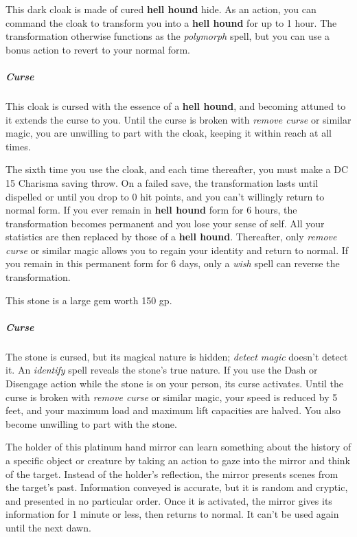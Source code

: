\documentclass[10pt,a4paper,twoside,bg=print,twocolumn,openany,nodeprecatedcode]{dndbook}
\begin{document}
This dark cloak is made of cured \textbf{hell hound} hide. As an action, you can command the cloak to transform you into a \textbf{hell hound} for up to 1 hour. The transformation otherwise functions as the \textit{polymorph} spell, but you can use a bonus action to revert to your normal form.

\subparagraph{Curse}
This cloak is cursed with the essence of a \textbf{hell hound}, and becoming attuned to it extends the curse to you. Until the curse is broken with \textit{remove curse} or similar magic, you are unwilling to part with the cloak, keeping it within reach at all times.

The sixth time you use the cloak, and each time thereafter, you must make a DC 15 Charisma saving throw. On a failed save, the transformation lasts until dispelled or until you drop to 0 hit points, and you can't willingly return to normal form. If you ever remain in \textbf{hell hound} form for 6 hours, the transformation becomes permanent and you lose your sense of self. All your statistics are then replaced by those of a \textbf{hell hound}. Thereafter, only \textit{remove curse} or similar magic allows you to regain your identity and return to normal. If you remain in this permanent form for 6 days, only a \textit{wish} spell can reverse the transformation.

This stone is a large gem worth 150 gp.

\subparagraph{Curse}
The stone is cursed, but its magical nature is hidden; \textit{detect magic} doesn't detect it. An \textit{identify} spell reveals the stone's true nature. If you use the Dash or Disengage action while the stone is on your person, its curse activates. Until the curse is broken with \textit{remove curse} or similar magic, your speed is reduced by 5 feet, and your maximum load and maximum lift capacities are halved. You also become unwilling to part with the stone.

The holder of this platinum hand mirror can learn something about the history of a specific object or creature by taking an action to gaze into the mirror and think of the target. Instead of the holder's reflection, the mirror presents scenes from the target's past. Information conveyed is accurate, but it is random and cryptic, and presented in no particular order. Once it is activated, the mirror gives its information for 1 minute or less, then returns to normal. It can't be used again until the next dawn.
\end{document}
